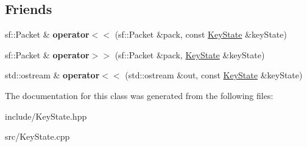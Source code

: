 \subsection*{Friends}
\begin{DoxyCompactItemize}
\item 
\hypertarget{class_key_state_ab41f00181962266823d9a1ea779294d6}{sf\-::\-Packet \& {\bfseries operator$<$$<$} (sf\-::\-Packet \&pack, const \hyperlink{class_key_state}{Key\-State} \&key\-State)}\label{class_key_state_ab41f00181962266823d9a1ea779294d6}

\item 
\hypertarget{class_key_state_aa508ce1c8f48dab284fd0b64074b78f4}{sf\-::\-Packet \& {\bfseries operator$>$$>$} (sf\-::\-Packet \&pack, \hyperlink{class_key_state}{Key\-State} \&key\-State)}\label{class_key_state_aa508ce1c8f48dab284fd0b64074b78f4}

\item 
\hypertarget{class_key_state_a5ec231cfca1b4c327e92ad9d18a3f205}{std\-::ostream \& {\bfseries operator$<$$<$} (std\-::ostream \&out, const \hyperlink{class_key_state}{Key\-State} \&key\-State)}\label{class_key_state_a5ec231cfca1b4c327e92ad9d18a3f205}

\end{DoxyCompactItemize}


The documentation for this class was generated from the following files\-:\begin{DoxyCompactItemize}
\item 
include/Key\-State.\-hpp\item 
src/Key\-State.\-cpp\end{DoxyCompactItemize}
